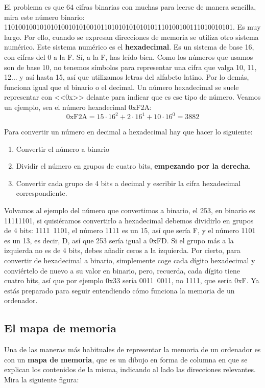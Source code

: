 \documentclass[a4paper]{article}
\begin{document}
El problema es que 64 cifras binarias con muchas para leerse de manera
sencilla, mira este número binario:
1101001001010101001010100101101010101010101110100100111010010101. Es muy
largo. Por ello, cuando se expresan direcciones de memoria se utiliza otro
sistema numérico. Este sistema
numérico es el \textbf{hexadecimal}. Es un sistema de base 16, con cifras del 0
a la F. Sí, a la F, has leído bien. Como los números que usamos son de base 10,
no tenemos símbolos para representar una cifra que valga 10, 11, 12... y así
hasta 15, así que utilizamos letras del alfabeto latino. Por lo demás, funciona
igual que el binario o el decimal. Un número hexadecimal se suele representar
con <<0x>> delante para indicar que es ese tipo de número. Veamos un ejemplo,
sea el número hexadecimal 0xF2A:
$$
\mathrm{0xF2A} = 15\cdot16^2 + 2\cdot16^1 + 10\cdot16^0 = 3882
$$

Para convertir un número en decimal a hexadecimal hay que hacer lo siguiente:
\begin{enumerate}
\item Convertir el número a binario
\item Dividir el número en grupos de cuatro bits, \textbf{empezando por la
derecha}.
\item Convertir cada grupo de 4 bits a decimal y escribir la cifra hexadecimal
correspondiente.
\end{enumerate}

Volvamos al ejemplo del número que convertimos a binario, el 253, en binario
es 11111101, si quisiéramos convertirlo a hexadecimal debemos dividirlo
en grupos de 4 bits: 1111~1101, el número 1111 es un 15, así que sería F,
y el número 1101 es un 13, es decir, D, así que 253 sería igual a
0xFD. Si el grupo más a la izquierda no es de 4 bits, debes
añadir ceros a la izquierda. Por cierto, para convertir de hexadecimal a
binario, simplemente coge cada dígito hexadecimal y conviértelo de nuevo a su
valor en binario, pero, recuerda, cada dígito tiene cuatro bits, así que por
ejemplo 0x33 sería 0011~0011, no 1111, que sería 0xF.
Ya estás preparado para seguir entendiendo cómo
funciona la memoria de un ordenador.

\subsection{El mapa de memoria}
Una de las maneras más habituales de representar la memoria de un ordenador
es con un \textbf{mapa de memoria}, que es un dibujo en forma de columna en
que se explican los contenidos de la misma, indicando al lado las direcciones
relevantes. Mira la siguiente figura:
\end{document}
